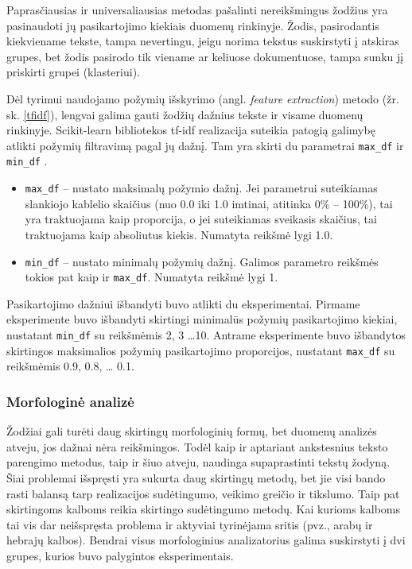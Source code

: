 \documentclass{VUMIFInfBakalaurinis}
\begin{document}
\label{freq}

Paprasčiausias ir universaliausias metodas pašalinti nereikšmingus
žodžius yra pasinaudoti jų pasikartojimo kiekiais duomenų rinkinyje.
Žodis, pasirodantis kiekviename tekste, tampa nevertingu, jeigu norima
tekstus suskirstyti į atskiras grupes, bet žodis pasirodo tik viename ar
keliuose dokumentuose, tampa sunku jį priskirti grupei (klasteriui).

Dėl tyrimui naudojamo požymių išskyrimo (angl. \emph{feature
extraction}) metodo (žr. sk. \ref{tfidf}), lengvai galima gauti žodžių dažnius
tekste ir visame duomenų rinkinyje. Scikit-learn bibliotekos tf-idf
realizacija suteikia patogią galimybę atlikti požymių filtravimą pagal
jų dažnį. Tam yra skirti du parametrai \texttt{max\_df} ir
\texttt{min\_df} .

\begin{itemize}
\item
  \texttt{max\_df} -- nustato maksimalų požymio dažnį. Jei parametrui
  suteikiamas slankiojo kablelio skaičius (nuo 0.0 iki 1.0 imtinai,
  atitinka 0\% -- 100\%), tai yra traktuojama kaip proporcija, o jei
  suteikiamas sveikasis skaičius, tai traktuojama kaip absoliutus
  kiekis. Numatyta reikšmė lygi 1.0.
\item
  \texttt{min\_df} -- nustato minimalų požymių dažnį. Galimos parametro
  reikšmės tokios pat kaip ir \texttt{max\_df}. Numatyta reikšmė lygi 1.
\end{itemize}

Pasikartojimo dažniui išbandyti buvo atlikti du eksperimentai. Pirmame
eksperimente buvo išbandyti skirtingi minimalūs požymių pasikartojimo
kiekiai, nustatant \texttt{min\_df} su reikšmėmis 2, 3 \ldots 10. Antrame
eksperimente buvo išbandytos skirtingos maksimalios požymių
pasikartojimo proporcijos, nustatant \texttt{max\_df} su reikšmėmis 0.9, 0.8, \ldots
0.1.

\subsubsection{Morfologinė analizė}

Žodžiai gali turėti daug skirtingų morfologinių formų, bet duomenų
analizės atveju, jos dažnai nėra reikšmingos. Todėl kaip ir aptariant
ankstesnius teksto parengimo metodus, taip ir šiuo atveju, naudinga
supaprastinti tekstų žodyną. Šiai problemai išspręsti yra sukurta daug
skirtingų metodų, bet jie visi bando rasti balansą tarp realizacijos
sudėtingumo, veikimo greičio ir tikslumo. Taip pat skirtingoms kalboms
reikia skirtingo sudėtingumo metodų. Kai kurioms kalboms tai vis dar
neišspręsta problema ir aktyviai tyrinėjama sritis (pvz., arabų ir
hebrajų kalbos). Bendrai visus morfologinius analizatorius galima
suskirstyti į dvi grupes, kurios buvo palygintos eksperimentais.
\end{document}
